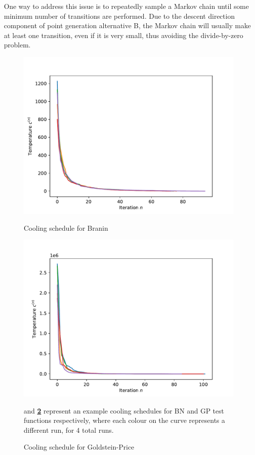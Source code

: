 One way to address this issue is to repeatedly sample a Markov chain until some minimum number of transitions are performed. Due to
the descent direction component of point generation alternative B, the Markov chain will usually make at least one transition, even
if it is very small, thus avoiding the divide-by-zero problem.

\begin{figure}[h]
    \centering
    \caption{Cooling schedule for Branin}
    \includegraphics[scale=0.42]{figures/fig31-branin.pdf}
    \label{fig:cooling-br}
\end{figure}

\begin{figure}[h]
    \centering
    \caption{Cooling schedule for Goldstein-Price}
    \includegraphics[scale=0.42]{figures/fig31-goldstein_price.pdf}
    \label{fig:cooling-gp}

    \vspace{10pt}

    \footnotesize
    \flushleft
    \textbf{} and \textbf{\cref{fig:cooling-gp}} represent an example cooling schedules for BN and GP test functions 
    respectively, where each colour on the curve represents a different run, for 4 total runs.

\end{figure}


